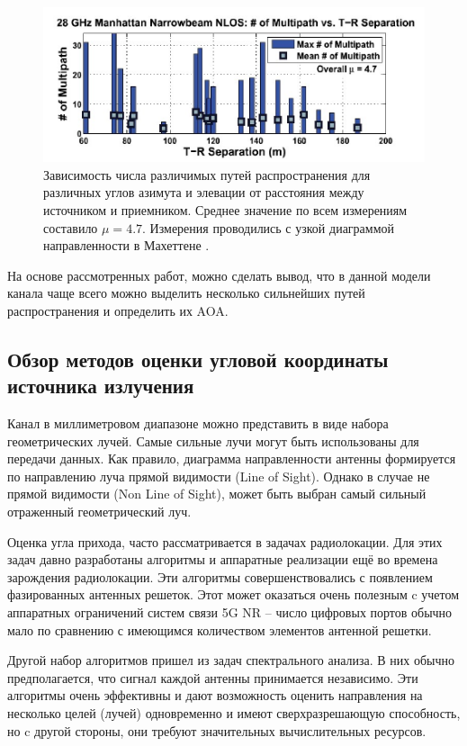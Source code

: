 \begin{figure}[ht!]
    \centering
    \includegraphics[width=0.8\linewidth]{figs/fig3.2}
    \caption{
        Зависимость числа различимых путей распространения для различных углов азимута и элевации от расстояния между источником и приемником.
        Среднее значение по всем измерениям составило $\mu=4.7$. Измерения проводились с узкой диаграммой направленности в Махеттене \cite{Rappaport2015}.}
    \label{fig:3.2}
\end{figure}

На основе рассмотренных работ, можно сделать вывод, что в данной модели
канала чаще всего можно выделить несколько сильнейших путей
распространения и определить их AOA.

\subsection{Обзор методов оценки угловой координаты источника излучения}
\label{sec:review}

Канал в миллиметровом диапазоне можно представить в виде
набора геометрических лучей.  Самые сильные лучи могут быть
использованы для передачи данных. Как правило, диаграмма направленности
антенны формируется по направлению луча прямой видимости (Line of Sight).
Однако в случае не прямой видимости (Non Line of Sight), может быть
выбран самый сильный отраженный геометрический луч. 

Оценка угла прихода, часто рассматривается в задачах
радиолокации.  Для этих задач  давно разработаны алгоритмы и аппаратные реализации
ещё во времена зарождения радиолокации. Эти алгоритмы совершенствовались с
появлением фазированных антенных решеток.  
Этот может оказаться очень  полезным c учетом  аппаратных ограничений систем
связи 5G NR -- число цифровых портов обычно мало по сравнению с имеющимся
количеством элементов антенной решетки. 

Другой набор алгоритмов пришел из задач спектрального анализа.  В них обычно
предполагается, что сигнал каждой антенны принимается независимо.  Эти алгоритмы
очень эффективны и дают возможность оценить направления на несколько целей
(лучей) одновременно и имеют сверхразрешающую способность, но c другой стороны,
они требуют значительных вычислительных ресурсов.  

